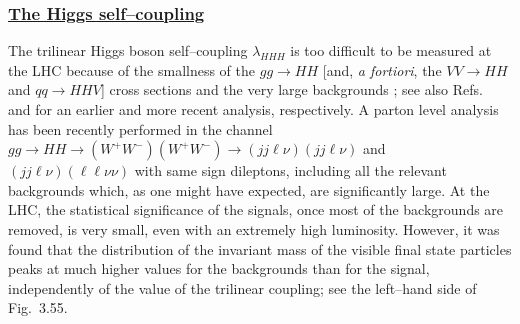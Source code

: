 \subsubsection*{\underline{The Higgs self--coupling}}

The trilinear Higgs boson self--coupling $\lambda_{HHH}$ is too difficult to be
measured at the LHC because of the smallness of the $gg\to HH$ [and, {\it a 
fortiori}, the $VV \to HH$ and $qq \to HHV$] cross sections and the very large 
backgrounds \cite{HHH-LHC,HHH-WW,HHH-bb}; see also Refs.~\cite{HHH-LHC-E} and
\cite{HHH-LHC-R} for an earlier and more recent analysis, respectively.  A
parton level analysis \cite{HHH-WW} has been recently performed in the channel
$gg\to HH \to (W^+W^-)(W^+W^-) \to (jj \ell \nu) (jj \ell \nu)$ and $(jj \ell
\nu) (\ell \ell \nu \nu)$ with same sign dileptons, including all the relevant
backgrounds which, as one might have expected, are significantly large. At the
LHC, the statistical significance of the signals, once most of the  backgrounds
are removed, is very small, even with an extremely high luminosity. However, it
was found that the distribution of the invariant mass of the visible final
state particles peaks at much higher values for the backgrounds than for the
signal, independently of the value of the trilinear coupling; see the left--hand
side of Fig.~3.55.\s
 
